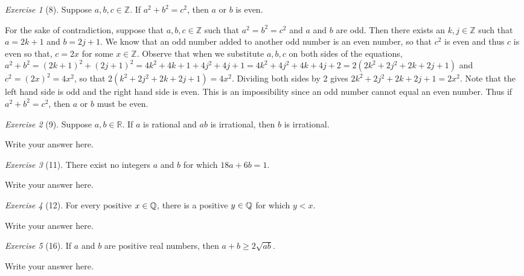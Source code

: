 \documentclass[12pt]{amsart}
\makeatletter
\theoremstyle{remark}
\newtheorem*{exercise}{Exercise}%
\def\RR{\ensuremath{\mathbb R}}
\def\ZZ{\ensuremath{\mathbb Z}}
\def\QQ{{\ensuremath\mathbb Q}}
\renewenvironment{proof}[1][\proofname]{\par\doublespacing
  \pushQED{\qed}%
  \normalfont \topsep6\p@\@plus6\p@\relax
  \list{}{%
    \settowidth{\leftmargin}{\itshape\proofname:\hskip\labelsep}%
    \setlength{\labelwidth}{0pt}%
    \setlength{\itemindent}{-\leftmargin}%
  }%
  \item[\hskip\labelsep\itshape#1\@addpunct{:}]\ignorespaces
}{%
  \popQED\endlist\@endpefalse
  \singlespacing
}
\theoremstyle{mycomment}
\makeatother
\begin{document}
\begin{exercise}[8] Suppose $a,b,c\in\ZZ$. If $a^{2}+b^{2}=c^{2}$, then $a$ or $b$ is even.
\begin{proof}
For the sake of contradiction, suppose that $a,b,c\in\ZZ$ such that $a^2=b^2=c^2$ and $a$ and $b$ are odd. Then there exists an $k,j\in\ZZ$ such that $a = 2k + 1$ and $b = 2j+1$. We know that an odd number added to another odd number is an even number, so that $c^2$ is even and thus $c$ is even so that, $c = 2x$ for some $x\in\ZZ$. Observe that when we substitute $a,b,c$ on both sides of the equations, $a^2 + b^2 = (2k+1)^2 + (2j+1)^2 = 4k^2 + 4k + 1 + 4j^2 + 4j + 1 = 4k^2 + 4j^2 + 4k + 4j + 2 = 2(2k^2 + 2j^2 + 2k + 2j + 1)$ and $c^2 = (2x)^2 = 4x^2$, so that $2(k^2 + 2j^2 + 2k + 2j + 1) = 4x^2$. Dividing both sides by 2 gives $2k^2 + 2j^2 + 2k + 2j + 1 = 2x^2$. Note that the left hand side is odd and the right hand side is even. This is an impossibility since an odd number cannot equal an even number. Thus if $a^2 + b^2=c^2$, then $a$ or $b$ must be even.
\end{proof}
\end{exercise}

\begin{exercise}[9] Suppose $a,b\in\RR$. If $a$ is rational and $ab$ is irrational, then $b$ is irrational.
\begin{proof}
Write your answer here.
\end{proof}
\end{exercise}

\begin{exercise}[11] There exist no integers $a$ and $b$ for which $18a+6b=1$.
\begin{proof}
Write your answer here.
\end{proof}
\end{exercise}

\begin{exercise}[12] For every positive $x\in\QQ$, there is a positive $y\in\QQ$ for which $y<x$.
\begin{proof}
Write your answer here.
\end{proof}
\end{exercise}

\begin{exercise}[16] If $a$ and $b$ are positive real numbers, then $a+b\ge 2\sqrt{ab}$.
\begin{proof}
Write your answer here.
\end{proof}
\end{exercise}
\end{document}
